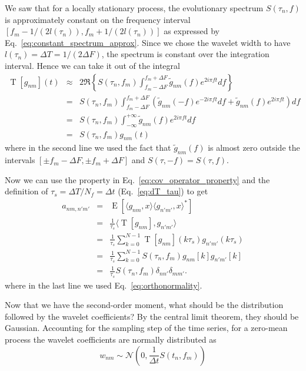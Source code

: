 \documentclass{article}
\begin{document}
We saw that for a locally stationary process, the evolutionary spectrum $S(\tau_n, f)$ is approximately constant on the frequency interval $[f_m - 1/(2 l(\tau_n)), f_m + 1/(2l(\tau_n))]$ as expressed by Eq.~\eqref{eq:constant_spectrum_approx}. Since we chose the wavelet width to have $l(\tau_n) = \Delta T = 1/(2\Delta F)$, the spectrum is constant over the integration interval. Hence we can take it out of the integral
\begin{eqnarray}
    \operatorname{T}[g_{nm}](t) & \approx & 2 \Re \left\{ S(\tau_n, f_m)  \int_{f_m -\Delta F}^{f_m +\Delta F}\tilde{g}_{nm}(f) e^{2 i \pi f t}  df \right\} \nonumber \\
    & = &  S(\tau_n, f_m) \int_{f_m -\Delta F}^{f_m +\Delta F} \left( \tilde{g}_{nm}(-f) e^{-2 i \pi f t}  df +  \tilde{g}_{nm}(f) e^{2 i \pi f t} \right) df\nonumber \\
    & = &  S(\tau_n, f_m) \int_{-\infty}^{+\infty} \tilde{g}_{nm}(f) e^{2 i \pi f t} df\nonumber \\
    & = & S(\tau_n, f_m) g_{nm}(t)
\end{eqnarray}
where in the second line we used the fact that $\tilde{g}_{nm}(f)$ is almost zero outside the intervals $[\pm f_m - \Delta F, \pm f_m + \Delta F]$ and $S(\tau, -f) = S(\tau, f)$.

Now we can use the property in Eq.~\eqref{eq:cov_operator_property} and the definition of $\tau_s = \Delta T / N_f = \Delta t$ (Eq.~\eqref{eq:dT_tau}) to get 
\begin{eqnarray}
\label{eq:cov_operator_property-applied}
    a_{nm, n'm'} &=&  \operatorname{E}\left[ \langle g_{nm} , x \rangle \langle g_{n'm'}, x \rangle^{\ast} \right] \nonumber \\
    & = & \frac{1}{\tau_s} \langle \operatorname{T}[g_{nm}], g_{n'm'} \rangle \nonumber \\
    & = & \frac{1}{\tau_s} \sum_{k=0}^{N-1} \operatorname{T}[g_{nm}](k \tau_s) g_{n'm'}(k \tau_s) \nonumber \\
    & = & \frac{1}{\tau_s} \sum_{k=0}^{N-1} S(\tau_n, f_m) g_{nm}[k] g_{n'm'}[k] \nonumber \\
    & = & \frac{1}{\tau_s} S(\tau_n, f_m) \delta_{n n'} \delta_{mm'}.
\end{eqnarray}
where in the last line we used Eq.~\eqref{eq:orthonormality}.

Now that we have the second-order moment, what should be the distribution followed by the wavelet coefficients? By the central limit theorem, they should be Gaussian. Accounting for the sampling step of the time series, for a zero-mean process the wavelet coefficients are normally distributed as
\begin{equation}\label{eq:evolutionary_psd_delta_t}
    w_{nm} \sim \mathcal{N}\left(0, \frac{1}{\Delta t} S(t_n, f_m) \right)
\end{equation}
\end{document}
